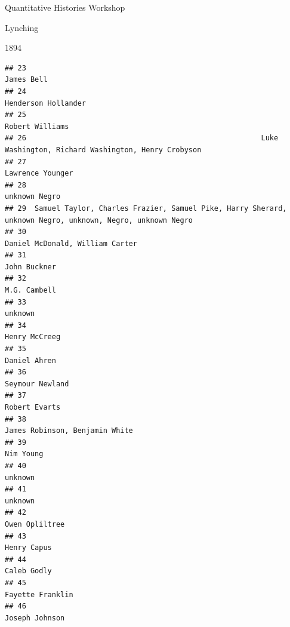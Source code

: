 \documentclass[
  ignorenonframetext,
]{beamer}
\begin{document}
\begin{frame}[fragile]{Quantitative Histories Workshop}
\begin{block}{Lynching}
\begin{block}{1894}
\begin{verbatim}
## 23                                                                                                James Bell
## 24                                                                                       Henderson Hollander
## 25                                                                                           Robert Williams
## 26                                                       Luke Washington, Richard Washington, Henry Crobyson
## 27                                                                                          Lawrence Younger
## 28                                                                                             unknown Negro
## 29  Samuel Taylor, Charles Frazier, Samuel Pike, Harry Sherard, unknown Negro, unknown, Negro, unknown Negro
## 30                                                                           Daniel McDonald, William Carter
## 31                                                                                              John Buckner
## 32                                                                                              M.G. Cambell
## 33                                                                                                   unknown
## 34                                                                                             Henry McCreeg
## 35                                                                                              Daniel Ahren
## 36                                                                                           Seymour Newland
## 37                                                                                             Robert Evarts
## 38                                                                            James Robinson, Benjamin White
## 39                                                                                                 Nim Young
## 40                                                                                                   unknown
## 41                                                                                                   unknown
## 42                                                                                            Owen Opliltree
## 43                                                                                               Henry Capus
## 44                                                                                               Caleb Godly
## 45                                                                                          Fayette Franklin
## 46                                                                                            Joseph Johnson

\end{verbatim}
\end{block}
\end{block}
\end{frame}
\end{document}

